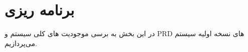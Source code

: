 \section{برنامه ریزی}
در این بخش به برسی موجودیت های کلی سیستم و PRD های نسخه اولیه سیستم می‌پردازیم.

